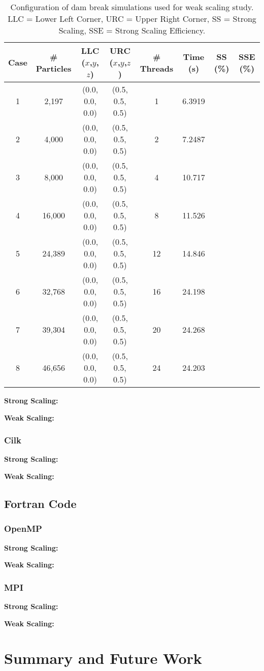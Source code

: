 \documentclass{scrartcl}
\begin{document}
    \begin{table}
        \begin{tabular}{| c | c | c | c | c | c | c | c |}
            \hline
            Case & \# Particles & LLC ($x$,$y$,$z$) & URC ($x$,$y$,$z$) & \# Threads & Time (s) & SS (\%)& SSE (\%) \\ \hline
            1 &  2,197 & (0.0, 0.0, 0.0) & (0.5, 0.5, 0.5) &  1 & 6.3919 & & \\ \hline		  		
            2 &  4,000 & (0.0, 0.0, 0.0) & (0.5, 0.5, 0.5) &  2 & 7.2487 & & \\ \hline		  		
            3 &  8,000 & (0.0, 0.0, 0.0) & (0.5, 0.5, 0.5) &  4 & 10.717 & & \\ \hline		  		
            4 & 16,000 & (0.0, 0.0, 0.0) & (0.5, 0.5, 0.5) &  8 & 11.526 & & \\ \hline		  		
            5 & 24,389 & (0.0, 0.0, 0.0) & (0.5, 0.5, 0.5) & 12 & 14.846 & & \\ \hline		  		
            6 & 32,768 & (0.0, 0.0, 0.0) & (0.5, 0.5, 0.5) & 16 & 24.198 & & \\ \hline		  		
            7 & 39,304 & (0.0, 0.0, 0.0) & (0.5, 0.5, 0.5) & 20 & 24.268 & & \\ \hline		  		
            8 & 46,656 & (0.0, 0.0, 0.0) & (0.5, 0.5, 0.5) & 24 & 24.203 & & \\ \hline		  		
        \end{tabular}
        \caption{Configuration of dam break simulations used for weak scaling study. LLC = Lower Left Corner, URC = Upper Right Corner, SS = Strong Scaling, SSE = Strong Scaling Efficiency.}
        \label{tab:ws}
    \end{table}
  
    \textbf{Strong Scaling:}
    
    \textbf{Weak Scaling:}
    
    \subsubsection{Cilk}
    \textbf{Strong Scaling:}

    \textbf{Weak Scaling:}
    \subsection{Fortran Code}    

    \subsubsection{OpenMP}
    \textbf{Strong Scaling:}

    \textbf{Weak Scaling:}  

    \subsubsection{MPI}
    \textbf{Strong Scaling:}

    \textbf{Weak Scaling:}

    \section{Summary and Future Work}
\end{document}
